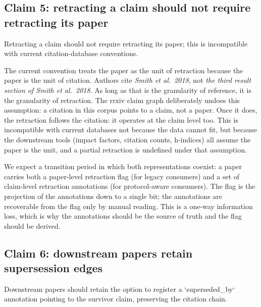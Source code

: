 \documentclass{rrxiv}
\begin{document}
\subsection*{Claim 5: retracting a claim should not require retracting its paper}
\begin{claim}[type=theoretical, evidence=argument, labels={retraction, metascience}, title=Claim 5]
\label{claim:c5}
Retracting a claim should not require retracting its paper; this is incompatible with current citation-database conventions.
\end{claim}

The current convention treats the paper as the unit of retraction because the paper is the unit of citation. Authors cite \emph{Smith et al.\ 2018}, not \emph{the third result section of Smith et al.\ 2018}. As long as that is the granularity of reference, it is the granularity of retraction. The rrxiv claim graph deliberately undoes this assumption: a citation in this corpus points to a claim, not a paper. Once it does, the retraction follows the citation: it operates at the claim level too. This is incompatible with current databases not because the data cannot fit, but because the downstream tools (impact factors, citation counts, h-indices) all assume the paper is the unit, and a partial retraction is undefined under that assumption.

We expect a transition period in which both representations coexist: a paper carries both a paper-level retraction flag (for legacy consumers) and a set of claim-level retraction annotations (for protocol-aware consumers). The flag is the projection of the annotations down to a single bit; the annotations are recoverable from the flag only by manual reading. This is a one-way information loss, which is why the annotations should be the source of truth and the flag should be derived.

\subsection*{Claim 6: downstream papers retain supersession edges}
\begin{claim}[type=theoretical, evidence=argument, labels={retraction, metascience}, title=Claim 6]
\label{claim:c6}
Downstream papers should retain the option to register a `superseded\_by` annotation pointing to the survivor claim, preserving the citation chain.
\end{claim}
\end{document}
